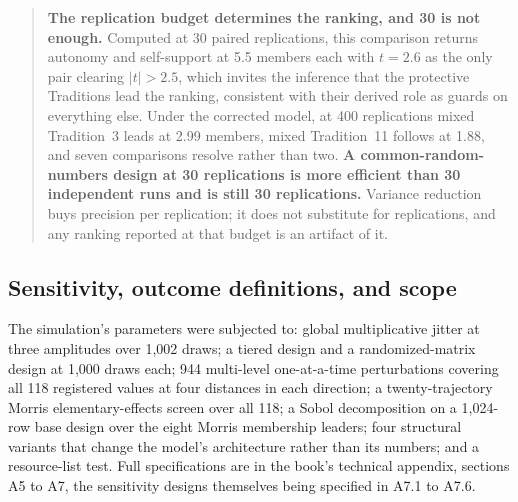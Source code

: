 \documentclass[11pt,a4paper]{article}
\begin{document}
\begin{quote}\small
\textbf{The replication budget determines the ranking, and 30 is not enough.}
Computed at 30 paired replications, this comparison returns autonomy and
self-support at 5.5 members each with $t = 2.6$ as the only pair clearing
$\lvert t \rvert > 2.5$, which invites the inference that the protective
Traditions lead the ranking, consistent with their derived role as guards on
everything else. Under the corrected model, at 400 replications mixed Tradition~3
leads at 2.99 members, mixed Tradition~11 follows at 1.88, and seven comparisons
resolve rather than two. \textbf{A common-random-numbers design at 30 replications is more
efficient than 30 independent runs and is still 30 replications.} Variance
reduction buys precision per replication; it does not substitute for replications,
and any ranking reported at that budget is an artifact of it.
\end{quote}

\subsection{Sensitivity, outcome definitions, and scope}

The simulation's parameters were subjected to: global multiplicative jitter at
three amplitudes over 1,002 draws; a tiered design and a randomized-matrix design
at 1,000 draws each; 944 multi-level one-at-a-time perturbations covering all 118
registered values at four distances in each direction; a twenty-trajectory Morris
elementary-effects screen over all 118; a Sobol decomposition on a 1,024-row base
design over the eight Morris membership leaders; four structural variants that
change the model's architecture rather than its numbers; and a resource-list test.
Full specifications are in the book's technical appendix, sections A5 to A7, the sensitivity designs themselves being specified in A7.1 to A7.6.
\end{document}
